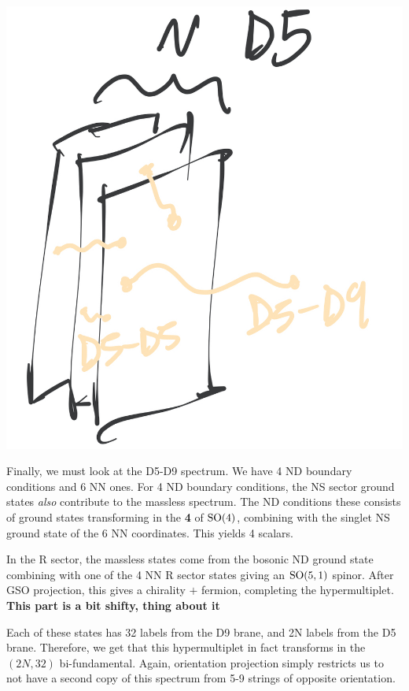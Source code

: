 \documentclass[11pt, class=article, crop=false]{standalone}
\begin{document}
\begin{enumerate}
	\begin{center}
		\includegraphics[scale=0.13]{"Drawings/D5"}
	\end{center}
	
	Finally, we must look at the D5-D9 spectrum. We have 4 ND boundary conditions and 6 NN ones. 
	For 4 ND boundary conditions, the NS sector ground states \emph{also} contribute to the massless spectrum. The ND conditions these consists of ground states transforming in the \textbf{4} of $\mathrm{SO}(4)$, combining with the singlet NS ground state of the 6 NN coordinates. This yields 4 scalars. 
	
	In the R sector, the massless states come from the bosonic ND ground state combining with one of the 4 NN R sector states giving an $\mathrm{SO}(5,1)$ spinor. After GSO projection, this gives a chirality $+$ fermion, completing the hypermultiplet.
	\textbf{This part is a bit shifty, thing about it}
	
	Each of these states has 32 labels from the D9 brane, and 2N labels from the D5 brane. Therefore, we get that this hypermultiplet in fact transforms in the $(2N, 32)$ bi-fundamental. Again, orientation projection simply restricts us to not have a second copy of this spectrum from 5-9 strings of opposite orientation.
	

\end{enumerate}
\end{document}
